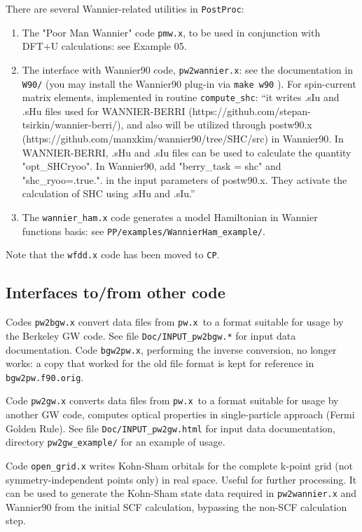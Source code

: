 \documentclass[12pt,a4paper]{article}
\def\pwx{\texttt{pw.x}}
\def\CP{\texttt{CP}}
\def\PostProc{\texttt{PostProc}}
\begin{document}
There are several Wannier-related utilities in \PostProc:
\begin{enumerate}
\item The "Poor Man Wannier" code \texttt{pmw.x}, to be used
in conjunction with DFT+U calculations: see Example 05.
\item The interface with Wannier90 code, \texttt{pw2wannier.x}:
see the documentation in \texttt{W90/} (you may install the 
Wannier90 plug-in via \texttt{make w90} ). For spin-current
matrix elements, implemented in routine \texttt{compute\_shc}:
``it writes .sIu and .sHu files used for
WANNIER-BERRI (https://github.com/stepan-tsirkin/wannier-berri/),
and also will be utilized through postw90.x
(https://github.com/manxkim/wannier90/tree/SHC/src) in Wannier90.
In WANNIER-BERRI, .sHu and .sIu files can be used to calculate the
quantity "opt\_SHCryoo". In Wannier90, add "berry\_task = shc" and
"shc\_ryoo=.true.". in the input parameters of postw90.x. They
activate the calculation of SHC using .sHu and .sIu.''
\item The \texttt{wannier\_ham.x} code generates a model Hamiltonian 
in Wannier functions basis: see \texttt{PP/examples/WannierHam\_example/}.
\end{enumerate}
Note that the \texttt{wfdd.x} code has been moved to \CP.

\subsection{Interfaces to/from other code}

Codes \texttt{pw2bgw.x} convert data files from \pwx\ to a format suitable
for usage by the Berkeley GW code. See file \texttt{Doc/INPUT\_pw2bgw.*}
for input data documentation. Code \texttt{bgw2pw.x}, performing the
inverse conversion, no longer works: a copy that worked for the old
file format is kept for reference in \texttt{bgw2pw.f90.orig}.

Code \texttt{pw2gw.x} converts data files from \pwx\ to a format suitable 
for usage by another GW code, computes optical properties in single-particle 
approach (Fermi Golden Rule). See file \texttt{Doc/INPUT\_pw2gw.html}
for input data documentation, directory \texttt{pw2gw\_example/}
for an example of usage.

Code \texttt{open\_grid.x} writes Kohn-Sham orbitals for the complete
k-point grid (not symmetry-independent points only) in real space.
Useful for further processing. It can be used to generate the
Kohn-Sham state data required in \texttt{pw2wannier.x} and Wannier90
from the initial SCF calculation, bypassing the non-SCF calculation
step.
\end{document}
